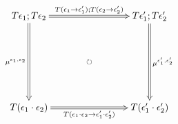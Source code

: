\documentclass[12pt]{article}
\begin{document}
\pagestyle{empty}

\begin{align*}
  \vcenter{
    \xymatrix@=80pt{
      T \epsilon_1; T \epsilon_2
      \ar@{=>}[d]_{\mu^{\epsilon_1,\epsilon_2}}
      \ar@{=>}[r]^{T (\epsilon_1 \to \epsilon'_1); T(\epsilon_2 \to \epsilon'_2)}
      \ar@{{}{ }{}}[rd]|{\circlearrowright}
      &
      T \epsilon'_1; T \epsilon'_2
      \ar@{=>}[d]^{\mu^{\epsilon'_1,\epsilon'_2}}
      \\
      T (\epsilon_1 \cdot \epsilon_2)
      \ar@{=>}[r]_{T (\epsilon_1 \cdot \epsilon_2 \to \epsilon'_1 \cdot \epsilon'_2)}
      &
      T (\epsilon'_1 \cdot \epsilon'_2)
    }
  }
\end{align*}
\end{document}
